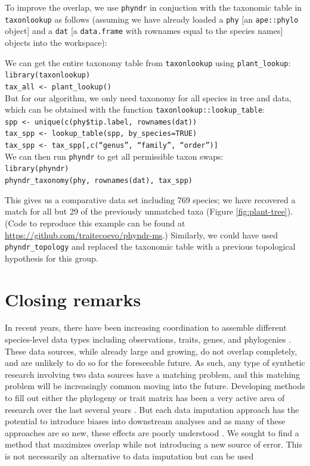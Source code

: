 \documentclass[a4paper,11pt]{article}
\newcommand{\phyndr}{\tt phyndr}
\newcommand{\taxonlookup}{\tt taxonlookup}
\begin{document}
To improve the overlap, we use {\phyndr} in conjuction with the taxonomic table in {\taxonlookup} as follows (assuming we have already loaded a \texttt{phy} [an \texttt{ape::phylo} object] and a \texttt{dat} [a \texttt{data.frame} with rownames equal to the species names] objects into the workspace):
\begin{flushleft}
We can get the entire taxonomy table from {\taxonlookup} using \texttt{plant\_lookup}:\\
\texttt{library(taxonlookup)}\\
\texttt{tax\_all <- plant\_lookup()}\\
\bigskip
But for our algorithm, we only need taxonomy for all species in tree and data, which can be obtained with the function \texttt{taxonlookup::lookup\_table}:\\
\texttt{spp <- unique(c(phy\$tip.label, rownames(dat))}\\
\texttt{tax\_spp <- lookup\_table(spp, by\_species=TRUE)}\\
\texttt{tax\_spp <- tax\_spp[,c(``genus'', ``family'', ``order'')]}\\
\bigskip
We can then run {\phyndr} to get all permissible taxon swaps:\\
\texttt{library(phyndr)}\\
\texttt{phyndr\_taxonomy(phy, rownames(dat), tax\_spp)}\\

\end{flushleft}
This gives us a comparative data set including 769 species; we have recovered a match for all but 29 of the previously unmatched taxa (Figure \ref{fig:plant-tree}). (Code to reproduce this example can be found at \url{https://github.com/traitecoevo/phyndr-ms}.) Similarly, we could have used \texttt{phyndr\_topology} and replaced the taxonomic table with a previous topological hypothesis for this group.


\section{Closing remarks}

In recent years, there have been increasing coordination to assemble different species-level data types including observations, traits, genes, and phylogenies \citep{Parr2012}.  These data sources, while already large and growing, do not overlap completely, and are unlikely to do so for the foreseeable future.  As such, any type of synthetic research involving two data sources have a matching problem, and this matching problem will be increasingly common moving into the future. Developing methods to fill out either the phylogeny or trait matrix has been a very active area of research over the last several years \citep{Garland2000, phylopars, Kuhn2011, Fagan2013, Ogle2013, ThomasPastis, PEM, Swenson2014, FitzJohn2014, Jetz2015, Sandel2015, Schrodt2015}. But each data imputation approach has the potential to introduce biases into downstream analyses and as many of these approaches are so new, these effects are poorly understood \citep{Rabosky2015}. We sought to find a method that maximizes overlap while not introducing a new source of error. This is not necessarily an alternative to data imputation but can be used 
\end{document}
